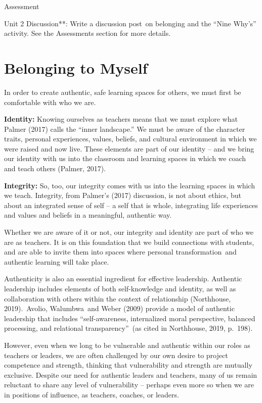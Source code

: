\documentclass[
]{book}
\begin{document}
\begin{assessment}
{Assessment}

Unit 2 Discussion**: Write a discussion post~on belonging and the ``Nine
Why's'' activity. See the Assessments section for more details.
\end{assessment}

\hypertarget{belonging-to-myself}{%
\section{Belonging to Myself}\label{belonging-to-myself}}

In order to create authentic, safe learning spaces for others, we must first be comfortable with who we are.

\textbf{Identity:} Knowing ourselves as teachers means that we must explore what Palmer (2017) calls the ``inner landscape.'' We must be aware of the character traits, personal experiences, values, beliefs, and cultural environment in which we were raised and now live. These elements are part of our identity -- and we bring our identity with us into the classroom and learning spaces in which we coach and teach others (Palmer, 2017).

\textbf{Integrity:} So, too, our integrity comes with us into the learning spaces in which we teach. Integrity, from Palmer's (2017) discussion, is not about ethics, but about an integrated sense of self -- a self that is whole, integrating life experiences and values and beliefs in a meaningful, authentic way.

Whether we are aware of it or not, our integrity and identity are part of who we are as teachers. It is on this foundation that we build connections with students, and are able to invite them into spaces where personal transformation~and authentic learning will take place.

Authenticity is also an essential ingredient for effective leadership. Authentic leadership includes elements of both self-knowledge and identity, as well as collaboration with others within the context of relationship (Northhouse, 2019).~Avolio, Walumbwa~and Weber (2009) provide a model of authentic leadership that includes ``self-awareness, internalized moral perspective, balanced processing, and relational transparency''~(as cited in Northhouse, 2019, p.~198).

However, even when we long to be vulnerable and authentic within our roles as teachers or leaders, we are often challenged by our own desire to project competence and strength, thinking that vulnerability and strength are mutually exclusive. Despite our need for authentic leaders and teachers, many of us remain reluctant to share any level of vulnerability -- perhaps even more so when we are in positions of influence, as teachers, coaches, or leaders.
\end{document}
